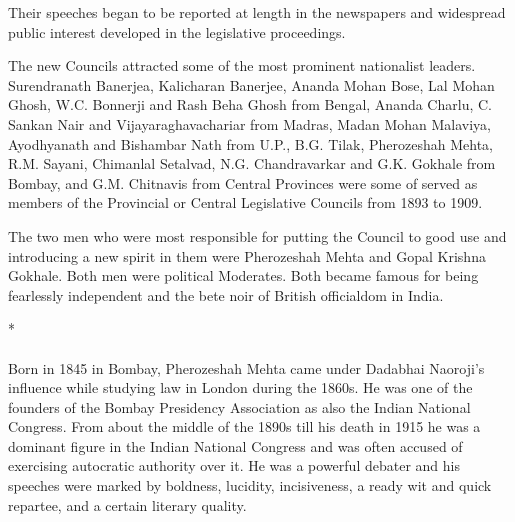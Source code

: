 Their speeches began to be reported at length in the newspapers and widespread public interest developed in the legislative proceedings.

The new Councils attracted some of the most prominent nationalist leaders. Surendranath Banerjea, Kalicharan Banerjee, Ananda Mohan Bose, Lal Mohan Ghosh, W.C. Bonnerji and Rash Beha Ghosh from Bengal, Ananda Charlu, C. Sankan Nair and Vijayaraghavachariar from Madras, Madan Mohan Malaviya, Ayodhyanath and Bishambar Nath from U.P., B.G. Tilak, Pherozeshah Mehta, R.M. Sayani, Chimanlal Setalvad, N.G. Chandravarkar and G.K. Gokhale from Bombay, and G.M. Chitnavis from Central Provinces were some of served as members of the Provincial or Central Legislative Councils from 1893 to 1909.

The two men who were most responsible for putting the Council to good use and introducing a new spirit in them were Pherozeshah Mehta and Gopal Krishna Gokhale. Both men were political Moderates. Both became famous for being fearlessly independent and the bete noir of British officialdom in India.

\begin{center}*\end{center}

\paragraph*{}


Born in 1845 in Bombay, Pherozeshah Mehta came under Dadabhai Naoroji's influence while studying law in London during the 1860s. He was one of the founders of the Bombay Presidency Association as also the Indian National Congress. From about the middle of the 1890s till his death in 1915 he was a dominant figure in the Indian National Congress and was often accused of exercising autocratic authority over it. He was a powerful debater and his speeches were marked by boldness, lucidity, incisiveness, a ready wit and quick repartee, and a certain literary quality.

